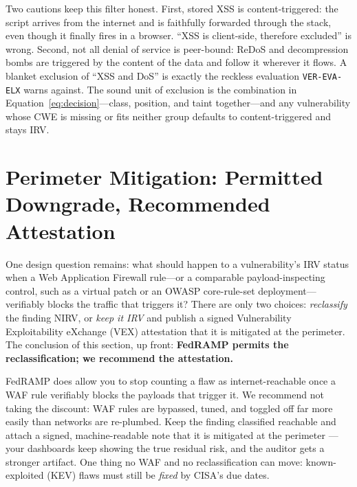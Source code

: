\documentclass[11pt]{article}
\newcommand{\code}[1]{\texttt{#1}}
\begin{document}
\begin{itemize}[leftmargin=1.5em]
\end{itemize}
Two cautions keep this filter honest. First, stored XSS is content-triggered: the script arrives from the internet and is faithfully forwarded through the stack, even though it finally fires in a browser. ``XSS is client-side, therefore excluded'' is wrong. Second, not all denial of service is peer-bound: ReDoS and decompression bombs are triggered by the content of the data and follow it wherever it flows. A blanket exclusion of ``XSS and DoS'' is exactly the reckless evaluation \code{VER-EVA-ELX} warns against. The sound unit of exclusion is the combination in Equation~\ref{eq:decision}---class, position, and taint together---and any vulnerability whose CWE is missing or fits neither group defaults to content-triggered and stays IRV.

\section{Perimeter Mitigation: Permitted Downgrade, Recommended Attestation}
\label{sec:waf}
One design question remains: what should happen to a vulnerability's IRV status when a Web Application Firewall rule---or a comparable payload-inspecting control, such as a virtual patch or an OWASP core-rule-set deployment---verifiably blocks the traffic that triggers it? There are only two choices: \emph{reclassify} the finding NIRV, or \emph{keep it IRV} and publish a signed Vulnerability Exploitability eXchange (VEX) attestation that it is mitigated at the perimeter. The conclusion of this section, up front: \textbf{FedRAMP permits the reclassification; we recommend the attestation.}

\begin{plain}
FedRAMP does allow you to stop counting a flaw as internet-reachable once a WAF rule verifiably blocks the payloads that trigger it. We recommend not taking the discount: WAF rules are bypassed, tuned, and toggled off far more easily than networks are re-plumbed. Keep the finding classified reachable and attach a signed, machine-readable note that it is mitigated at the perimeter --- your dashboards keep showing the true residual risk, and the auditor gets a stronger artifact. One thing no WAF and no reclassification can move: known-exploited (KEV) flaws must still be \emph{fixed} by CISA's due dates.
\end{plain}
\end{document}
